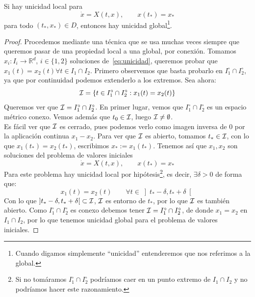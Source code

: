 \begin{lema}\label{lema:1unicidad}
    Si hay unicidad local para
    \begin{equation*}
        \dot{x} = X(t,x), \qquad x(t_\ast) = x_\ast
    \end{equation*}
    para todo $(t_\ast,x_\ast)\in D$, entonces hay unicidad global\footnote{Cuando digamos simplemente ``unicidad'' entenderemos que nos referimos a la global.}.
    \begin{proof}
        Procedemos mediante una técnica que se usa muchas veces siempre que queremos pasar de una propiedad local a una global, por conexión. Tomamos $x_i:I_i\to \mathbb{R}^d$, $i \in \{1,2\}$ soluciones de~\eqref{eq:unicidad}, queremos probar que $x_1(t) = x_2(t)$\newline $\forall t\in I_1\cap I_2$. Primero observemos que basta probarlo en $I_1^\circ\cap I_2^\circ$, ya que por continuidad podemos extenderlo a los extremos. Sea ahora:
        \begin{equation*}
            \mathcal{I} = \{t\in I_1^\circ\cap I_2^\circ: x_1(t) = x_2(t)\}
        \end{equation*}
        Queremos ver que $\mathcal{I} = I_1^\circ\cap I_2^\circ$. En primer lugar, vemos que $I_1^\circ\cap I_2^\circ$ es un espacio métrico conexo. Vemos además que $t_0 \in \mathcal{I}$, luego $\mathcal{I}\neq \emptyset $.\\

        \noindent
        Es fácil ver que $\mathcal{I}$ es cerrado, pues podemos verlo como imagen inversa de $0$ por la aplicación continua $x_1-x_2$. Para ver que $\mathcal{I}$ es abierto, tomamos $t_\ast\in \mathcal{I}$, con lo que $x_1(t_\ast) = x_2(t_\ast)$, escribimos $x_\ast := x_1(t_\ast)$. Tenemos así que $x_1,x_2$ son soluciones del problema de valores iniciales
        \begin{equation*}
            \dot{x} = X(t,x), \qquad x(t_\ast) = x_\ast
        \end{equation*}
        Para este problema hay unicidad local por hipótesis\footnote{Si no tomáramos $I_1^\circ\cap I_2^\circ$ podríamos caer en un punto extremo de $I_1\cap I_2$ y no podríamos hacer este razonamiento.}, es decir, $\exists \delta>0$ de forma que:
        \begin{equation*}
            x_1(t) = x_2(t) \qquad \forall t\in \left]t_\ast-\delta,t_\ast+\delta\right[
        \end{equation*}
        Con lo que $\left]t_\ast-\delta,t_\ast+\delta\right[\subset \mathcal{I}$, $\mathcal{I}$ es entorno de $t_\ast$, por lo que $\mathcal{I}$ es también abierto. Como $I_1^\circ \cap I_2^\circ$ es conexo debemos tener $\mathcal{I} = I_1^\circ \cap I_2^\circ$, de donde $x_1 = x_2$ en $I_1\cap I_2$, por lo que tenemos unicidad global para el problema de valores iniciales.
    \end{proof}
\end{lema}

